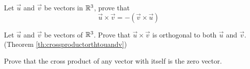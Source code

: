 \documentclass{ximera}
\begin{document}
\begin{problem}
    Let $\vec{u}$ and $\vec{v}$ be vectors in $\mathbb{R}^3$, prove that
$$\vec{u}\times\vec{v}=-(\vec{v}\times\vec{u})$$
\end{problem}


\begin{problem}\label{prob:crossproductorthtouandv}
Let $\vec{u}$ and $\vec{v}$ be vectors of $\mathbb{R}^3$.  Prove that $\vec{u}\times\vec{v}$ is orthogonal to both $\vec{u}$ and $\vec{v}$. (Theorem \ref{th:crossproductorthtouandv})
\end{problem}

\begin{problem}\label{prob:crossself}
Prove that the cross product of any vector with itself is the zero vector.
\end{problem}


\end{document}
